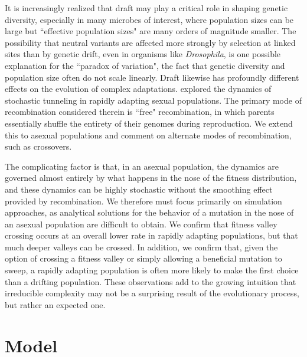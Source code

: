 \documentclass[rmp]{revtex4}
\begin{document}
It is increasingly realized that draft may play a critical role in shaping genetic diversity, especially in many microbes of interest, where population sizes can be large but ``effective population sizes" are many orders of magnitude smaller.
The possibility that neutral variants are affected more strongly by selection at linked sites than by genetic drift, even in organisms like \emph{Drosophila}, is one possible explanation for the ``paradox of variation", the fact that genetic diversity and population size often do not scale linearly.
Draft likewise has profoundly different effects on the evolution of complex adaptations.
\citet{neher_shraiman_2011} explored the dynamics of stochastic tunneling in rapidly adapting sexual populations.
The primary mode of recombination considered therein is ``free" recombination, in which parents essentially shuffle the entirety of their genomes during reproduction.
We extend this to asexual populations and comment on alternate modes of recombination, such as crossovers.

The complicating factor is that, in an asexual population, the dynamics are governed almost entirely by what happens in the nose of the fitness distribution, and these dynamics can be highly stochastic without the smoothing effect provided by recombination.
We therefore must focus primarily on simulation approaches, as analytical solutions for the behavior of a mutation in the nose of an asexual population are difficult to obtain.
We confirm that fitness valley crossing occurs at an overall lower rate in rapidly adapting populations, but that much deeper valleys can be crossed.
In addition, we confirm that, given the option of crossing a fitness valley or simply allowing a beneficial mutation to sweep, a rapidly adapting population is often more likely to make the first choice than a drifting population.
These observations add to the growing intuition that irreducible complexity may not be a surprising result of the evolutionary process, but rather an expected one.

\section*{Model}
\end{document}
